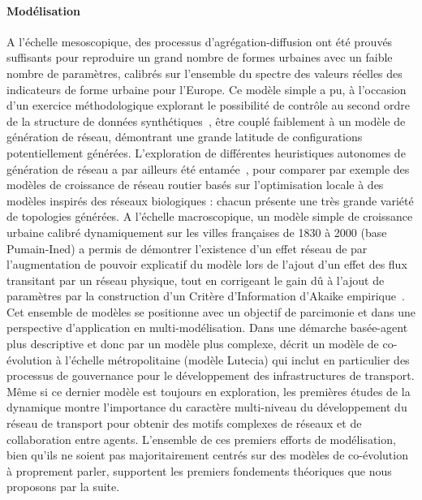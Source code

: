 \paragraph{Modélisation}

A l'échelle mesoscopique, des processus d'agrégation-diffusion ont été prouvés suffisants pour reproduire un grand nombre de formes urbaines avec un faible nombre de paramètres, calibrés sur l'ensemble du spectre des valeurs réelles des indicateurs de forme urbaine pour l'Europe. Ce modèle simple a pu, à l'occasion d'un exercice méthodologique explorant le possibilité de contrôle au second ordre de la structure de données synthétiques~\cite{raimbault2016generation}, être couplé faiblement à un modèle de génération de réseau, démontrant une grande latitude de configurations potentiellement générées. L'exploration de différentes heuristiques autonomes de génération de réseau a par ailleurs été entamée~\cite{raimbault2015labex}, pour comparer par exemple des modèles de croissance de réseau routier basés sur l'optimisation locale à des modèles inspirés des réseaux biologiques : chacun présente une très grande variété de topologies générées. A l'échelle macroscopique, un modèle simple de croissance urbaine calibré dynamiquement sur les villes françaises de 1830 à 2000 (base Pumain-Ined) a permis de démontrer l'existence d'un effet réseau de par l'augmentation de pouvoir explicatif du modèle lors de l'ajout d'un effet des flux transitant par un réseau physique, tout en corrigeant le gain dû à l'ajout de paramètres par la construction d'un Critère d'Information d'Akaike empirique~\cite{raimbault2016models}. Cet ensemble de modèles se positionne avec un objectif de parcimonie et dans une perspective d'application en multi-modélisation. Dans une démarche basée-agent plus descriptive et donc par un modèle plus complexe, \cite{le2015modeling} décrit un modèle de co-évolution à l'échelle métropolitaine (modèle Lutecia) qui inclut en particulier des processus de gouvernance pour le développement des infrastructures de transport. Même si ce dernier modèle est toujours en exploration, les premières études de la dynamique montre l'importance du caractère multi-niveau du développement du réseau de transport pour obtenir des motifs complexes de réseaux et de collaboration entre agents. L'ensemble de ces premiers efforts de modélisation, bien qu'ils ne soient pas majoritairement centrés sur des modèles de co-évolution à proprement parler, supportent les premiers fondements théoriques que nous proposons par la suite.



